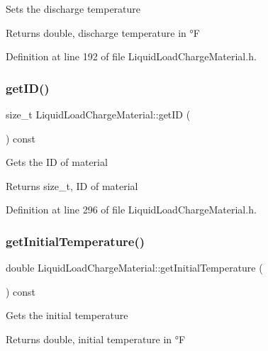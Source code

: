 Sets the discharge temperature \begin{DoxyReturn}{Returns}
double, discharge temperature in °F 
\end{DoxyReturn}


Definition at line 192 of file Liquid\+Load\+Charge\+Material.\+h.

\mbox{\label{class_liquid_load_charge_material_a07e869cabd98a5179536559a1c0f4b35}} 
\subsubsection{\texorpdfstring{get\+I\+D()}{getID()}}
{\footnotesize\ttfamily size\+\_\+t Liquid\+Load\+Charge\+Material\+::get\+ID (\begin{DoxyParamCaption}{ }\end{DoxyParamCaption}) const\hspace{0.3cm}{\ttfamily [inline]}}

Gets the ID of material \begin{DoxyReturn}{Returns}
size\+\_\+t, ID of material 
\end{DoxyReturn}


Definition at line 296 of file Liquid\+Load\+Charge\+Material.\+h.

\mbox{\label{class_liquid_load_charge_material_ab80229a78f884fb07e756665a616d401}} 
\subsubsection{\texorpdfstring{get\+Initial\+Temperature()}{getInitialTemperature()}}
{\footnotesize\ttfamily double Liquid\+Load\+Charge\+Material\+::get\+Initial\+Temperature (\begin{DoxyParamCaption}{ }\end{DoxyParamCaption}) const\hspace{0.3cm}{\ttfamily [inline]}}

Gets the initial temperature \begin{DoxyReturn}{Returns}
double, initial temperature in °F 
\end{DoxyReturn}


